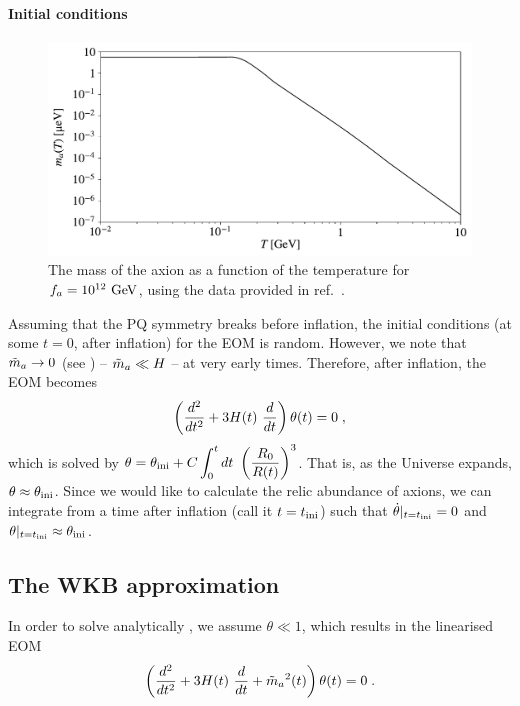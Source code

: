 \documentclass[11pt,a4paper]{article}
\begin{document}
\paragraph{Initial conditions}
%
\begin{figure}[h!]
	\includegraphics[width=1\textwidth]{figs/axion_mass.pdf}
	\caption{The mass of the axion as a function of the temperature for $f_{a}{}=10^{12}~{\rm GeV}$, using the data provided in ref.~\cite{Borsanyi:2016ksw}.}
	\label{fig:axion_mass}
\end{figure}
%
Assuming that the PQ symmetry breaks before inflation, the initial conditions (\ie at some $t=0$, after inflation) for the EOM is random. However, we note that $\tilde m_{a}{} \to 0$ (see ) -- \ie $\tilde m_{a}{} \ll H$ -- at very early times. Therefore, after inflation, the EOM becomes
%
\begin{equation}
	\left( \dfrac{d^2}{d t^2} + 3 H(t) \ \dfrac{d}{d t}   \right) \theta(t) = 0 \; ,
	\label{eq:massless_eom}
\end{equation}
%
which is solved by $\theta = \theta_{\rm ini}{} + C \displaystyle \int_{0}^t d t \ \left(  \dfrac{R_{0}}{R(t)}  \right)^3$. That is, as the Universe expands, $\theta \approx \theta_{\rm ini}{}$. Since we would like to calculate the relic abundance of axions, we can integrate  from a time after inflation (call it $t = t_{\rm ini}{}$) such that $ \dot \theta |_{t=t_{\rm ini}{}} = 0$ and  $\theta|_{t=t_{\rm ini}{}} \approx \theta_{\rm ini}{}$.   



\subsection{The WKB approximation}
%
In order to solve analytically , we assume $\theta \ll 1$, which results in the linearised EOM
%
\begin{equation}
	\left( \dfrac{d^2}{d t^2} + 3 H(t) \ \dfrac{d}{d t} + \tilde m_{a}{}^2(t)  \right) \theta(t) = 0 \; .
	\label{eq:linear_eom}
\end{equation}
\end{document}
